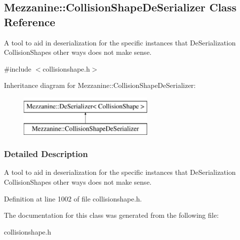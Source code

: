 \hypertarget{classMezzanine_1_1CollisionShapeDeSerializer}{
\subsection{Mezzanine::CollisionShapeDeSerializer Class Reference}
\label{classMezzanine_1_1CollisionShapeDeSerializer}
}


A tool to aid in deserialization for the specific instances that DeSerialization CollisionShapes other ways does not make sense.  




{\ttfamily \#include $<$collisionshape.h$>$}

Inheritance diagram for Mezzanine::CollisionShapeDeSerializer:\begin{figure}[H]
\begin{center}
\leavevmode
\includegraphics[height=2.000000cm]{classMezzanine_1_1CollisionShapeDeSerializer}
\end{center}
\end{figure}


\subsubsection{Detailed Description}
A tool to aid in deserialization for the specific instances that DeSerialization CollisionShapes other ways does not make sense. 

Definition at line 1002 of file collisionshape.h.



The documentation for this class was generated from the following file:\begin{DoxyCompactItemize}
\item 
collisionshape.h\end{DoxyCompactItemize}
